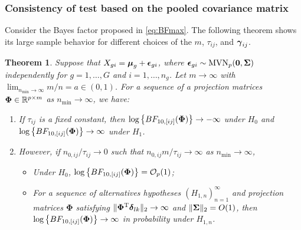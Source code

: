 \documentclass[times,sort&compress,3p]{elsarticle}
\theoremstyle{plain}%
\newtheorem{theorem}{Theorem}
\theoremstyle{definition}
\def\bzero{{\mathbf 0}}
\def\log{\hbox{log}}
\def\MVN{\hbox{MVN}}
\def\log{\hbox{log}}
\def\trans{^{\rm T}}
\def\bzero{{\mathbf 0}}
\newcommand{\bSigma}{\mbox{\boldmath $\Sigma$}}
\newcommand{\ugamma}            {\mbox{\boldmath$\gamma$}}
\newcommand{\udelta}            {\mbox{\boldmath$\delta$}}
\newcommand{\uepsilon}          {\mbox{\boldmath$\epsilon$}}
\newcommand{\umu}               {\mbox{\boldmath$\mu$}}
\newcommand{\uSigma}            {\mbox{\boldmath$\Sigma$}}
\newcommand{\uPhi}              {\mbox{\boldmath$\Phi$}}
\newcommand{\rsz}[1]{\textcolor{red}{#1}}
\begin{document}
\subsubsection{Consistency of test based on the pooled covariance matrix}
Consider the Bayes factor proposed in \eqref{eq:BFmax}. The following theorem shows its large sample behavior for different choices of the $m$, $\tau_{ij}$, and $\ugamma_{ij}$. 
\begin{theorem}\label{Thrm1}
Suppose that $X_{gi} = \umu_g + \uepsilon_{gi}$, where $\uepsilon_{gi} \sim \MVN_{p}(\bzero, \uSigma)$ independently for $g = 1, \ldots, G$ and $i = 1,\ldots,n_g$. Let $m \rightarrow \infty$ with $ \lim_{n_{\min} \rightarrow \infty} m / n =  a \in  (0, 1)$. For a sequence of a projection matrices $\uPhi \in \mathbb{R}^{p \times m}$ as $n_{\min} \rightarrow \infty$, we have:
\begin{enumerate}
    \item If $\tau_{ij}$ is a fixed constant, 
    then $\log\left\{BF_{10, [ij]}(\uPhi) \right\} \rightarrow -\infty$ under $H_0$ and $\log\left\{BF_{10, [ij]}(\uPhi) \right\} \rightarrow \infty$ under $H_1$. 
    \item However, if 
    $n_{0,ij}/\tau_{ij} \rightarrow 0$ such that $n_{0,ij}m/\tau_{ij} \rightarrow \infty$ as $n_{\min} \rightarrow \infty$,  
   
    \begin{itemize}
        \item[(a)] Under $H_0$, $\log\left\{BF_{10, [ij]}(\uPhi) \right\} = \mathcal{O}_{p}(1)$;
        \item[(b)] 
        For a sequence of alternatives hypotheses $(H_{1,n})_{n = 1}^\infty$ and projection matrices $\mathbf{\Phi}$ satisfying $\|\mathbf{\Phi}\trans\udelta_{lk}\|_2\to\infty$ and $\|\bSigma\|_2 = O(1)$, then $\log\left\{BF_{10, [ij]}(\uPhi) \right\} \rightarrow \infty$ in probability under $H_{1,n}$. 
    \end{itemize} 
\end{enumerate}
\end{theorem}
\end{document}
